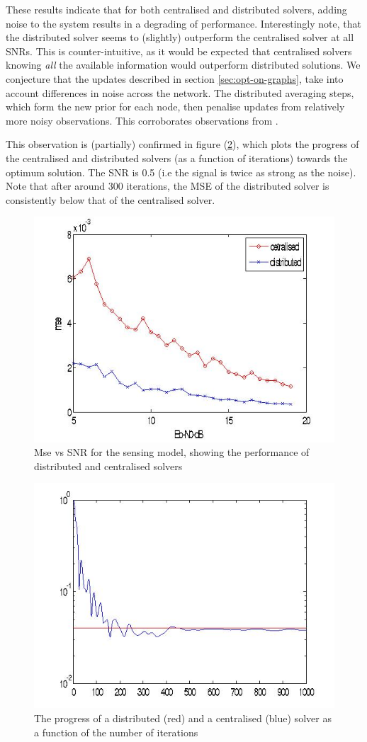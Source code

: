 \documentclass{article}
\begin{document}
These results indicate that for both centralised and distributed solvers, adding noise to the system results in a degrading of performance. Interestingly note, that the distributed solver seems to (slightly) outperform the centralised solver at all SNRs. This is counter-intuitive, as it would be expected that centralised solvers knowing \textit{all} the available information would outperform distributed solutions. We conjecture that the updates described in section \eqref{sec:opt-on-graphs}, take into account differences in noise across the network. The distributed averaging steps, which form the new prior for each node, then penalise updates from relatively more noisy observations. This corroborates observations from \cite{bazerque2008}.

This observation is (partially) confirmed in figure (\ref{erroriterations}), which plots the progress of the centralised and distributed solvers (as a function of iterations) towards the optimum solution. The SNR is 0.5 (i.e the signal is twice as strong as the noise). Note that after around 300 iterations, the MSE of the distributed solver is consistently below that of the centralised solver.

\begin{figure}[h]
\centering
\includegraphics[height = 6 cm]{centvsdistmsegaussian10perpoint.jpg}
\caption{Mse vs SNR for the sensing model, showing the performance of distributed and centralised solvers}
\label{msevssnr1}
\end{figure}

\begin{figure}[h]
\centering
\includegraphics[height = 6 cm]{erroriterations1.jpg}
\caption{The progress of a distributed (red) and a centralised (blue) solver as a function of the number of iterations}
\label{erroriterations}
\end{figure}


\end{document}
